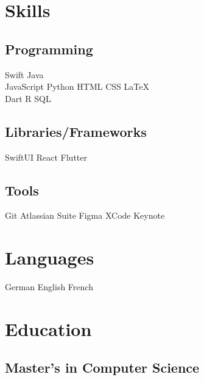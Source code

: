 \documentclass[]{cv}
\begin{document}
\begin{minipage}[t]{0.25\textwidth} 


\section{Skills}
\subsection{Programming}
\sectionsep
{}
Swift \textbullet{} Java \\
\sectionsep
{}
JavaScript \textbullet{} Python \textbullet{} HTML \textbullet{} CSS \textbullet{} \LaTeX\ \\
\sectionsep
{}
Dart \textbullet{} R \textbullet{} SQL \\
\sectionsep
\sectionsep
\subsection{Libraries/Frameworks}
\sectionsep
SwiftUI \textbullet{} React \textbullet{} Flutter \\
\sectionsep
\sectionsep
\subsection{Tools}
\sectionsep
Git \textbullet{} Atlassian Suite \textbullet{} Figma \textbullet{} XCode \textbullet{} Keynote
\sectionsep


\section{Languages}
German
English
French
\sectionsep


\section{Education} 
\subsection{Master's in Computer Science}


\end{minipage}
\end{document}
